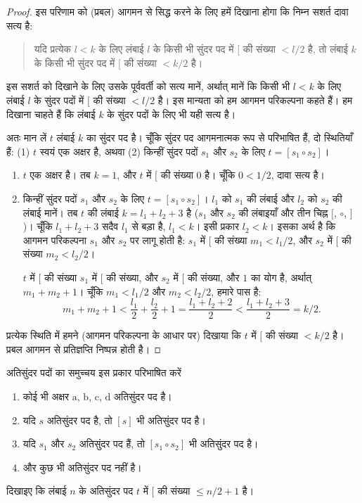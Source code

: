 \documentclass[../../../include/open-logic-section]{subfiles}
\begin{document}
\begin{proof}
इस परिणाम को (प्रबल) आगमन से सिद्ध करने के लिए हमें दिखाना होगा कि निम्न
सशर्त दावा सत्य है:
\begin{quote}
  यदि प्रत्येक $l<k$ के लिए लंबाई $l$ के किसी भी सुंदर पद में $[$ की
  संख्या $<l/2$ है, तो लंबाई $k$ के किसी भी सुंदर पद में $[$ की संख्या
  $<k/2$ है।
\end{quote}
इस सशर्त को दिखाने के लिए उसके पूर्ववर्ती को सत्य मानें, अर्थात् मानें कि
किसी भी $l<k$ के लिए लंबाई $l$ के सुंदर पदों में $[$ की संख्या $<l/2$ है।
इस मान्यता को हम आगमन परिकल्पना कहते हैं। हम दिखाना चाहते हैं कि लंबाई $k$
के सुंदर पदों के लिए भी यही सत्य है।

अतः मान लें $t$ लंबाई $k$ का सुंदर पद है। चूँकि सुंदर पद आगमनात्मक रूप से
परिभाषित हैं, दो स्थितियाँ हैं: (1) $t$ स्वयं एक अक्षर है, अथवा (2) किन्हीं
सुंदर पदों $s_1$ और $s_2$ के लिए $t=[s_1\circ s_2]$।
\begin{enumerate}
\item $t$ एक अक्षर है। तब $k=1$, और $t$ में $[$ की संख्या $0$ है। चूँकि
$0<1/2$, दावा सत्य है।
\item किन्हीं सुंदर पदों $s_1$ और $s_2$ के लिए $t=[s_1\circ s_2]$। $l_1$
  को $s_1$ की लंबाई और $l_2$ को $s_2$ की लंबाई मानें। तब $t$ की लंबाई
  $k=l_1+l_2+3$ है ($s_1$ और $s_2$ की लंबाइयाँ और तीन चिह्न $[$,
  $\circ$, $]$)। चूँकि $l_1+l_2+3$ सदैव $l_1$ से बड़ा है, $l_1<k$। इसी
  प्रकार $l_2<k$। इसका अर्थ है कि आगमन परिकल्पना $s_1$ और $s_2$ पर लागू
  होती है: $s_1$ में $[$ की संख्या $m_1<l_1/2$, और $s_2$ में $[$ की
  संख्या $m_2<l_2/2$।

  $t$ में $[$ की संख्या $s_1$ में $[$ की संख्या, और $s_2$ में $[$ की
  संख्या, और $1$ का योग है, अर्थात् $m_1+m_2+1$। चूँकि $m_1<l_1/2$ और
  $m_2<l_2/2$, हमारे पास है:
  \[
  m_1 + m_2 + 1 < \frac{l_1}{2} + \frac{l_2}{2} + 1 = \frac{l_1+l_2+2}{2} < \frac{l_1+l_2+3}{2} = k/2.
  \]
\end{enumerate}
प्रत्येक स्थिति में हमने (आगमन परिकल्पना के आधार पर) दिखाया कि $t$ में $[$
की संख्या $<k/2$ है। प्रबल आगमन से प्रतिज्ञप्ति निष्पन्न होती है।
\end{proof}

\begin{prob}
  अतिसुंदर पदों का समुच्चय इस प्रकार परिभाषित करें
  \begin{enumerate}
  \item कोई भी अक्षर $\mathrm{a}$, $\mathrm{b}$, $\mathrm{c}$,
    $\mathrm{d}$ अतिसुंदर पद है।
  \item यदि $s$ अतिसुंदर पद है, तो $[s]$ भी अतिसुंदर पद है।
  \item यदि $s_1$ और $s_2$ अतिसुंदर पद हैं, तो $[s_1\circ s_2]$ भी
    अतिसुंदर पद है।
  \item और कुछ भी अतिसुंदर पद नहीं है।
  \end{enumerate}
  दिखाइए कि लंबाई $n$ के अतिसुंदर पद $t$ में $[$ की संख्या
  $\le n/2 +1$ है।
\end{prob}
\end{document}
